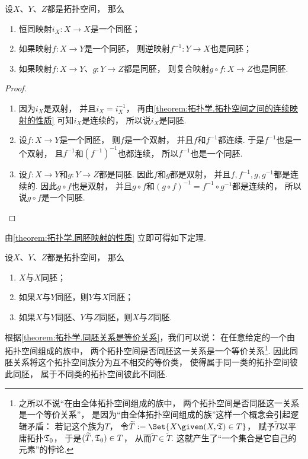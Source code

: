 \begin{theorem}\label{theorem:拓扑学.同胚映射的性质}
设\(X\)、\(Y\)、\(Z\)都是拓扑空间，
那么\begin{enumerate}
	\item 恒同映射\(i_X\colon X \to X\)是一个同胚；
	\item 如果映射\(f\colon X \to Y\)是一个同胚，
	则逆映射\(f^{-1}\colon Y \to X\)也是同胚；
	\item 如果映射\(f\colon X \to Y\)、\(g\colon Y \to Z\)都是同胚，
	则复合映射\(g \circ f\colon X \to Z\)也是同胚.
\end{enumerate}
\begin{proof}
\begin{enumerate}
	\item 因为\(i_X\)是双射，
	并且\(i_X = i_X^{-1}\)，
	再由\cref{theorem:拓扑学.拓扑空间之间的连续映射的性质}
	可知\(i_X\)是连续的，
	所以说\(i_X\)是同胚.

	\item 设\(f\colon X \to Y\)是一个同胚，
	则\(f\)是一个双射，
	并且\(f\)和\(f^{-1}\)都连续.
	于是\(f^{-1}\)也是一个双射，
	且\(f^{-1}\)和\((f^{-1})^{-1}\)也都连续，
	所以\(f^{-1}\)也是一个同胚.

	\item 设\(f\colon X \to Y\)和\(g\colon Y \to Z\)都是同胚.
	因此\(f\)和\(g\)都是双射，
	并且\(f,f^{-1},g,g^{-1}\)都是连续的.
	因此\(g \circ f\)也是双射，
	并且\(g \circ f\)和\((g \circ f)^{-1} = f^{-1} \circ g^{-1}\)都是连续的，
	所以说\(g \circ f\)是一个同胚.
	\qedhere
\end{enumerate}
\end{proof}
\end{theorem}

由\cref{theorem:拓扑学.同胚映射的性质} 立即可得如下定理.
\begin{theorem}\label{theorem:拓扑学.同胚关系是等价关系}
设\(X\)、\(Y\)、\(Z\)都是拓扑空间，
那么\begin{enumerate}
	\item \(X\)与\(X\)同胚；
	\item 如果\(X\)与\(Y\)同胚，则\(Y\)与\(X\)同胚；
	\item 如果\(X\)与\(Y\)同胚、\(Y\)与\(Z\)同胚，则\(X\)与\(Z\)同胚.
\end{enumerate}
\end{theorem}
根据\cref{theorem:拓扑学.同胚关系是等价关系}，我们可以说：
在任意给定的一个由拓扑空间组成的族中，
两个拓扑空间是否同胚这一关系是一个等价关系\footnote{
	之所以不说“在由全体拓扑空间组成的族中，
	两个拓扑空间是否同胚这一关系是一个等价关系”，
	是因为“由全体拓扑空间组成的族”这样一个概念会引起逻辑矛盾：
	若记这个族为\(T\)，
	令\(\widetilde{T} \defeq \Set{ X \given (X,\T) \in T }\)，
	赋予\(\widetilde{T}\)以平庸拓扑\({\mathfrak T}_0\)，
	于是\((\widetilde{T},{\mathfrak T}_0) \in T\)，
	从而\(\widetilde{T} \in \widetilde{T}\).
	这就产生了“一个集合是它自己的元素”的悖论.
}.
因此同胚关系将这个拓扑空间族分为互不相交的等价类，
使得属于同一类的拓扑空间彼此同胚，
属于不同类的拓扑空间彼此不同胚.

